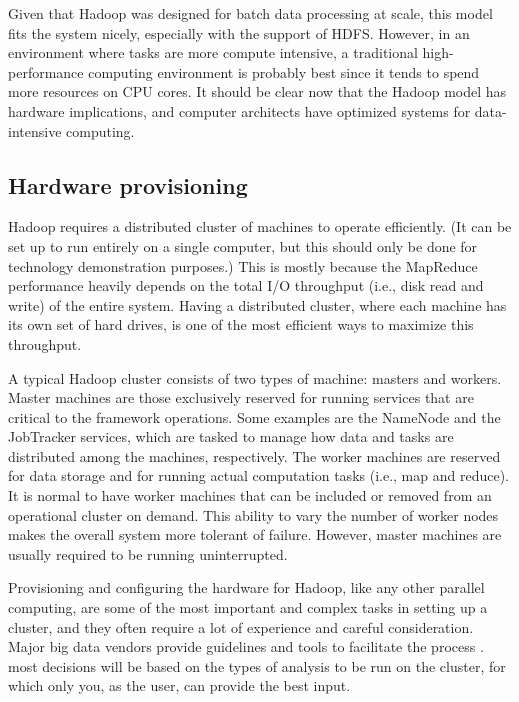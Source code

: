 \documentclass[]{krantz}
\begin{document}
Given that Hadoop was designed for batch data processing at scale, this
model fits the system nicely, especially with the support of HDFS.
However, in an environment where tasks are more compute intensive, a
traditional high-performance computing environment is probably best
since it tends to spend more resources on CPU cores. It should be clear
now that the Hadoop model has hardware implications, and computer
architects have optimized systems for data-intensive computing.

\subsection{Hardware provisioning}\label{hardware-provisioning}

Hadoop requires a distributed cluster of machines to operate
efficiently. (It can be set up to run entirely on a single computer, but
this should only be done for technology demonstration purposes.) This is
mostly because the MapReduce performance heavily depends on the total
I/O throughput (i.e., disk read and write) of the entire system. Having
a distributed cluster, where each machine has its own set of hard
drives, is one of the most efficient ways to maximize this throughput.

A typical Hadoop cluster consists of two types of machine: masters and
workers. Master machines are those exclusively reserved for running
services that are critical to the framework operations. Some examples
are the NameNode and the JobTracker services, which are tasked to manage
how data and tasks are distributed among the machines, respectively. The
worker machines are reserved for data storage and for running actual
computation tasks (i.e., map and reduce). It is normal to have worker
machines that can be included or removed from an operational cluster on
demand. This ability to vary the number of worker nodes makes the
overall system more tolerant of failure. However, master machines are
usually required to be running uninterrupted.

Provisioning and configuring the hardware for Hadoop, like any other
parallel computing, are some of the most important and complex tasks in
setting up a cluster, and they often require a lot of experience and
careful consideration. Major big data vendors provide guidelines and
tools to facilitate the process \citep{ApacheAmbari, ClouderaManager}.
most decisions will be based on the types of analysis to be run on the
cluster, for which only you, as the user, can provide the best input.
\end{document}
